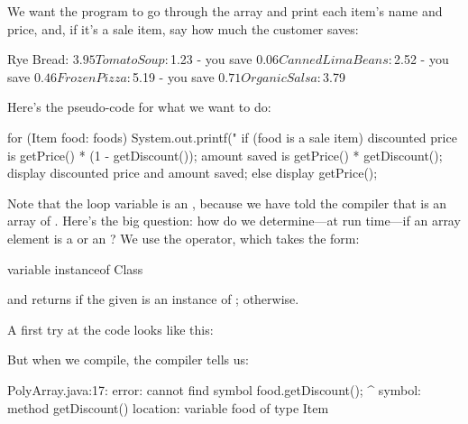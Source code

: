 We want the program to go through the array and print each item's name and price, and, if it's a sale item, say how much the customer saves:

\begin{stdout}
Rye Bread: $3.95
Tomato Soup: $1.23 - you save $0.06
Canned Lima Beans: $2.52 - you save $0.46
Frozen Pizza: $5.19 - you save $0.71
Organic Salsa: $3.79
\end{stdout}

Here's the pseudo-code for what we want to do:

\begin{code}
for (Item food: foods) {
    System.out.printf("%
    if (food is a sale item) {
        discounted price is getPrice() * (1 - getDiscount());
        amount saved is getPrice() * getDiscount();
        display discounted price and amount saved;
    } else {
        display getPrice();
    }
}
\end{code}

Note that the  loop variable is an , because we have told the compiler that  is an array of .  Here's the big question: how do we determine---at run time---if an array element is a  or an ? We use the  operator, which takes the form:

\begin{code}
variable instanceof Class
\end{code}

and returns  if the given  is an instance of ;  otherwise.

A first try at the code looks like this:


But when we compile, the compiler tells us:

\begin{stdout}
PolyArray.java:17: error: cannot find symbol
            food.getDiscount();
                ^
  symbol:   method getDiscount()
  location: variable food of type Item
\end{stdout}

